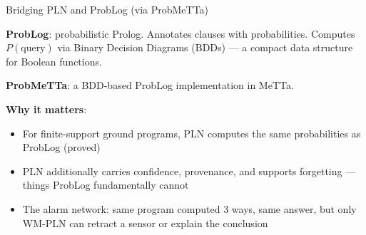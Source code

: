 \documentclass[aspectratio=169,11pt]{beamer}
\begin{document}
\begin{frame}{Bridging PLN and ProbLog (via ProbMeTTa)}

\textbf{ProbLog}: probabilistic Prolog. Annotates clauses with
probabilities.  Computes $P(\text{query})$ via Binary Decision
Diagrams (BDDs) --- a compact data structure for Boolean functions.

\textbf{ProbMeTTa}: a BDD-based ProbLog implementation in MeTTa.

\medskip
\begin{center}
\end{center}

\medskip
\textbf{Why it matters}:
\begin{itemize}
\item For finite-support ground programs, PLN computes the
  \alert{same probabilities} as ProbLog (proved)
\item PLN additionally carries \alert{confidence}, \alert{provenance},
  and supports \alert{forgetting} --- things ProbLog fundamentally cannot
\item The alarm network: same program computed 3 ways, same answer,
  but only WM-PLN can retract a sensor or explain the conclusion
\end{itemize}

\end{frame}


\end{document}
